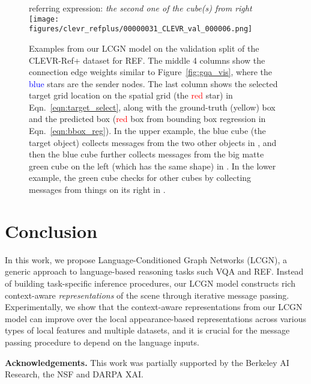 \documentclass[10pt,twocolumn,letterpaper]{article}
\begin{document}
\begin{figure*}[t]
referring expression: \textit{the second one of the cube(s) from right} \\
\texttt{[image: figures/clevr\_refplus/00000031\_CLEVR\_val\_000006.png]} \\

\caption{Examples from our LCGN model on the validation split of the CLEVR-Ref+ dataset for REF. The middle 4 columns show the connection edge weights  similar to Figure~\ref{fig:gqa_vis}, where the \textcolor{blue}{blue} stars are the sender nodes. The last column shows the selected target grid location  on the  spatial grid (the \textcolor{red}{red} star) in Eqn.~\ref{eqn:target_select}, along with the ground-truth (\textcolor[rgb]{.7,.7,0}{yellow}) box and the predicted box (\textcolor{red}{red} box from bounding box regression  in Eqn.~\ref{eqn:bbox_reg}). In the upper example, the blue cube (the target object) collects messages from the two other objects in , and then the blue cube further collects messages from the big matte green cube on the left (which has the same shape) in . In the lower example, the green cube checks for other cubes by collecting messages from things on its right in .}
\label{fig:clevr_refplus_vis}
\end{figure*}
 \section{Conclusion}

In this work, we propose Language-Conditioned Graph Networks (LCGN), a generic approach to language-based reasoning tasks such VQA and REF. Instead of building task-specific inference procedures, our LCGN model constructs rich context-aware \textit{representations} of the scene through iterative message passing. Experimentally, we show that the context-aware representations from our LCGN model can improve over the local appearance-based representations across various types of local features and multiple datasets, and it is crucial for the message passing procedure to depend on the language inputs.

\noindent\textbf{Acknowledgements.} This work was partially supported by the Berkeley AI Research, the NSF and DARPA XAI. 
\clearpage

{\small


}

\clearpage

\appendix

\setcounter{table}{0}
\renewcommand{\thetable}{\Alph{section}.\arabic{table}}
\setcounter{figure}{0}
\renewcommand{\thefigure}{\Alph{section}.\arabic{figure}}
\setcounter{equation}{0}
\renewcommand{\theequation}{\Alph{section}.\arabic{equation}}
\end{document}
